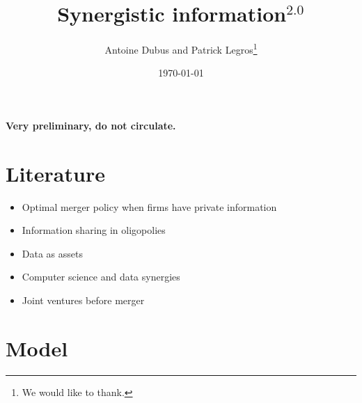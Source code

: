 \documentclass[a4paper]{article}
\begin{document}
\title{Synergistic information$^2.0$}
\author{Antoine Dubus and Patrick Legros\thanks{We would like to thank.}}
\date{\today}


\maketitle

\begin{abstract}

\noindent 

\end{abstract}
 
\textbf{Very preliminary, do not circulate.}

\baselineskip0.7cm

\section{Literature}
\begin{itemize}\setlength\itemsep{-1em}
    \item Optimal merger policy when firms have private information \cite{Besanko1993}
    \item Information sharing in oligopolies
    \item Data as assets
    \item Computer science and data synergies
    \item Joint ventures before merger
\end{itemize}

\section{Model}
\end{document}
